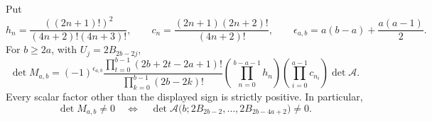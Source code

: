 \begin{lemma}
\label{opf:normalization}
Put
\[
 h_n=\frac{((2n+1)!)^2}{(4n+2)!(4n+3)!},\qquad
 c_n=\frac{(2n+1)(2n+2)!}{(4n+2)!},
 \qquad \epsilon_{a,b}=a(b-a)+\frac{a(a-1)}2.
\]
For $b\ge2a$, with $U_j=2B_{2b-2j}$,
\begin{equation}\label{opf:exact-multiplier}
 \det M_{a,b}=(-1)^{\epsilon_{a,b}}
 \frac{\prod_{t=0}^{b-1}(2b+2t-2a+1)!}
      {\prod_{k=0}^{b-1}(2b-2k)!}
 \left(\prod_{n=0}^{b-a-1}h_n\right)
 \left(\prod_{i=0}^{a-1}c_{n_i}\right)\det\mathcal A.
\end{equation}
Every scalar factor other than the displayed sign is strictly
positive. In particular,
\begin{equation}\label{opf:equivalence}
 \det M_{a,b}\ne0
 \quad\Longleftrightarrow\quad
 \det\mathcal A\bigl(b;2B_{2b-2},\ldots,2B_{2b-4a+2}\bigr)\ne0.
\end{equation}
\end{lemma}

